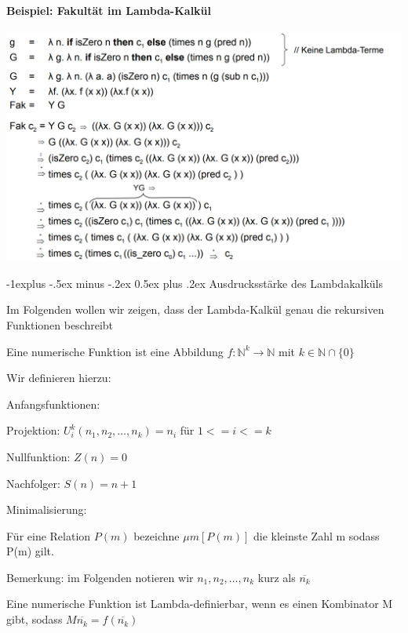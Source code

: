 \documentclass[10pt]{article}
\makeatletter
\renewcommand{\subsection}{\@startsection{subsection}{2}{0mm}%
                                {-1explus -.5ex minus -.2ex}%
                                {0.5ex plus .2ex}%
                                {\normalfont\normalsize\bfseries}}
\makeatother
\begin{document}
  \paragraph{Beispiel: Fakultät im Lambda-Kalkül}
  \includegraphics[width=.4\linewidth]{Assets/Programmierparadigmen-Lambda_Abstraktion}
  
  \subsection{Ausdrucksstärke des Lambdakalküls}
  \begin{itemize*}
    \item Im Folgenden wollen wir zeigen, dass der Lambda-Kalkül genau die rekursiven Funktionen beschreibt
    \item Eine numerische Funktion ist eine Abbildung $f:\mathbb{N}^k \rightarrow \mathbb{N}$ mit $k\in\mathbb{N} \cap \{0\}$
    \item Wir definieren hierzu:
    \begin{itemize*}
      \item Anfangsfunktionen:
      \begin{itemize*}
        \item Projektion: $U_i^k (n_1,n_2,…,n_k) = n_i$ für $1<=i<=k$
        \item Nullfunktion: $Z(n) = 0$
        \item Nachfolger: $S(n) = n+1$
      \end{itemize*}
      \item Minimalisierung:
      \begin{itemize*}
        \item Für eine Relation $P(m)$ bezeichne $\mu m[P(m)]$ die kleinste Zahl m sodass P(m) gilt.
      \end{itemize*}
    \end{itemize*}
    \item Bemerkung: im Folgenden notieren wir $n_1,n_2,…,n_k$ kurz als $\overline{n_k}$
    \item Eine numerische Funktion ist Lambda-definierbar, wenn es einen Kombinator M gibt, sodass $M\overline{n_k} = f(\overline{n_k})$
  \end{itemize*}
  
\end{document}
